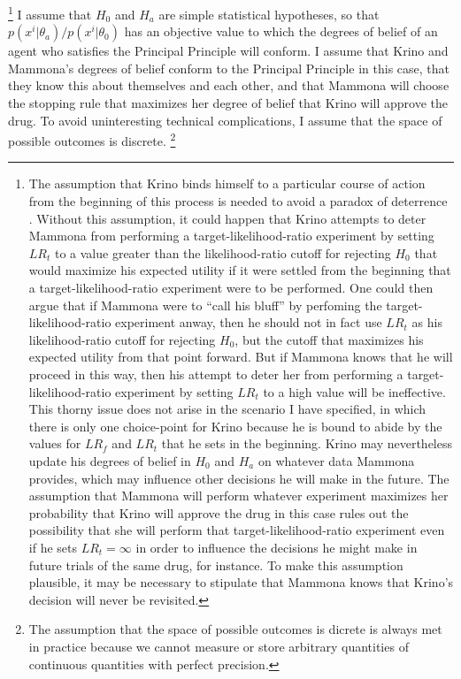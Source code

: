 \documentclass{article}
\theoremstyle{definition}
\begin{document}
\footnote{%
The assumption that Krino binds himself to a particular course of action from the beginning of this process is needed to avoid a paradox of deterrence \citep{kavka78}.
Without this assumption, it could happen that Krino attempts to deter Mammona from performing a target-likelihood-ratio experiment by setting $LR_t$ to a value greater than the likelihood-ratio cutoff for rejecting $H_0$ that would maximize his expected utility if it were settled from the beginning that a target-likelihood-ratio experiment were to be performed.
One could then argue that if Mammona were to ``call his bluff'' by perfoming the target-likelihood-ratio experiment anway, then he should not in fact use $LR_t$  as his likelihood-ratio cutoff for rejecting $H_0$, but the cutoff that maximizes his expected utility from that point forward.
But if Mammona knows that he will proceed in this way, then his attempt to deter her from performing a target-likelihood-ratio experiment by setting $LR_t$ to a high value will be ineffective.
This thorny issue does not arise in the scenario I have specified, in which there is only one choice-point for Krino because he is bound to abide by the values for $LR_f$ and $LR_t$ that he sets in the beginning.
Krino may nevertheless update his degrees of belief in $H_0$ and $H_a$ on whatever data Mammona provides, which may influence other decisions he will make in the future.
The assumption that Mammona will perform whatever experiment maximizes her probability that Krino will approve the drug in this case rules out the possibility that she will perform that target-likelihood-ratio experiment even if he sets $LR_t=\infty$ in order to influence the decisions he might make in future trials of the same drug, for instance.
To make this assumption plausible, it may be necessary to stipulate that Mammona knows that Krino's decision will never be revisited.
}
I assume that $H_0$ and $H_a$ are simple statistical hypotheses, so that $p(x^i|\theta_a)/p(x^i|\theta_0)$ has an objective value to which the degrees of belief of an agent who satisfies the Principal Principle will conform.
I assume that Krino and Mammona's degrees of belief conform to the Principal Principle in this case, that they know this about themselves and each other, and that Mammona will choose the stopping rule that maximizes her degree of belief that Krino will approve the drug.
To avoid uninteresting technical complications, I assume that the space of possible outcomes is discrete.%
\footnote{%
The assumption that the space of possible outcomes is dicrete is always met in practice because we cannot measure or store arbitrary quantities of continuous quantities with perfect precision.
}
\end{document}
